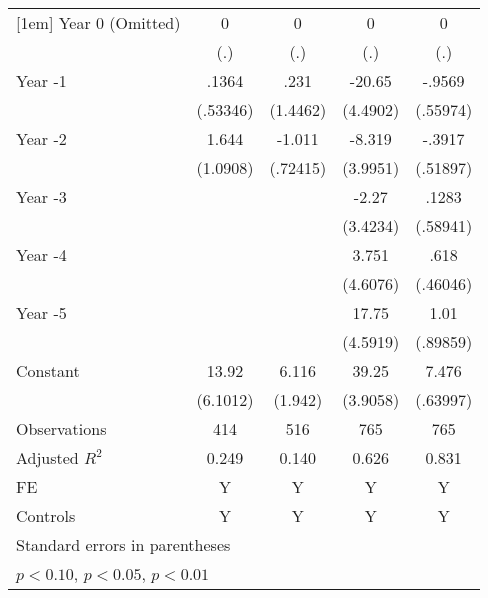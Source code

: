 \begin{table}[htbp]
\begin{tabular}{l*{4}{c}}
[1em]
Year 0 (Omitted)    &           0         &           0         &           0         &           0         \\
                    &         (.)         &         (.)         &         (.)         &         (.)         \\
[1em]
Year -1             &       .1364         &        .231         &      -20.65\sym{***}&      -.9569\sym{*}  \\
                    &    (.53346)         &    (1.4462)         &    (4.4902)         &    (.55974)         \\
[1em]
Year -2             &       1.644         &      -1.011         &      -8.319\sym{**} &      -.3917         \\
                    &    (1.0908)         &    (.72415)         &    (3.9951)         &    (.51897)         \\
[1em]
Year -3             &                     &                     &       -2.27         &       .1283         \\
                    &                     &                     &    (3.4234)         &    (.58941)         \\
[1em]
Year -4             &                     &                     &       3.751         &        .618         \\
                    &                     &                     &    (4.6076)         &    (.46046)         \\
[1em]
Year -5             &                     &                     &       17.75\sym{***}&        1.01         \\
                    &                     &                     &    (4.5919)         &    (.89859)         \\
[1em]
Constant            &       13.92\sym{**} &       6.116\sym{***}&       39.25\sym{***}&       7.476\sym{***}\\
                    &    (6.1012)         &     (1.942)         &    (3.9058)         &    (.63997)         \\
\hline
Observations        &         414         &         516         &         765         &         765         \\
Adjusted \(R^{2}\)  &       0.249         &       0.140         &       0.626         &       0.831         \\
FE                  &           Y         &           Y         &           Y         &           Y         \\
Controls            &           Y         &           Y         &           Y         &           Y         \\
\hline\hline
\multicolumn{5}{l}{\footnotesize Standard errors in parentheses}\\
\multicolumn{5}{l}{\footnotesize \sym{*} \(p<0.10\), \sym{**} \(p<0.05\), \sym{***} \(p<0.01\)}\\
\end{tabular}
\end{table}
